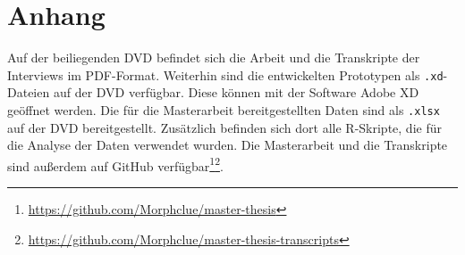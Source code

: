 \section{Anhang}
Auf der beiliegenden DVD befindet sich die Arbeit und die Transkripte der Interviews im PDF-Format.
Weiterhin sind die entwickelten Prototypen als \texttt{.xd}-Dateien auf der DVD verfügbar.
Diese können mit der Software Adobe XD geöffnet werden.
Die für die Masterarbeit bereitgestellten Daten sind als \texttt{.xlsx} auf der DVD bereitgestellt.
Zusätzlich befinden sich dort alle R-Skripte, die für die Analyse der Daten verwendet wurden.
Die Masterarbeit und die Transkripte sind außerdem auf GitHub verfügbar\footnote{\url{https://github.com/Morphclue/master-thesis}}\footnote{\url{https://github.com/Morphclue/master-thesis-transcripts}}.
